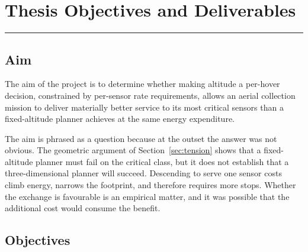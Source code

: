 \chapter{Thesis Objectives and Deliverables}
\label{chap:objectives}
\noindent \rule{6.6in}{0.01in}
\minitoc
\newpage

\section{Aim}

The aim of the project is to determine whether making altitude a per-hover decision, constrained by per-sensor rate requirements, allows an aerial collection mission to deliver materially better service to its most critical sensors than a fixed-altitude planner achieves at the same energy expenditure.

The aim is phrased as a question because at the outset the answer was not obvious. The geometric argument of Section~\ref{sec:tension} shows that a fixed-altitude planner must fail on the critical class, but it does not establish that a three-dimensional planner will succeed. Descending to serve one sensor costs climb energy, narrows the footprint, and therefore requires more stops. Whether the exchange is favourable is an empirical matter, and it was possible that the additional cost would consume the benefit.

\section{Objectives}

